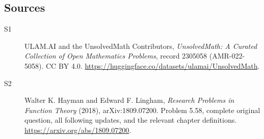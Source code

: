 \documentclass[11pt]{book}
\begin{document}
\subsection{Sources}
\begin{description}
\item[\hypertarget{source:2305058:1}{S1}] ULAM.AI and the UnsolvedMath Contributors, \emph{UnsolvedMath: A Curated Collection of Open Mathematics Problems}, record 2305058 (AMR-022-5058). CC BY 4.0. \url{https://huggingface.co/datasets/ulamai/UnsolvedMath}.
\item[\hypertarget{source:2305058:2}{S2}] Walter K. Hayman and Edward F. Lingham, \emph{Research Problems in Function Theory} (2018), arXiv:1809.07200. Problem 5.58, complete original question, all following updates, and the relevant chapter definitions. \url{https://arxiv.org/abs/1809.07200}.
\end{description}
\label{end:2305058}
\end{document}
